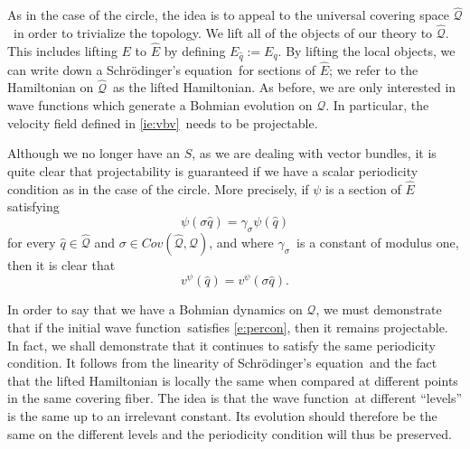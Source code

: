 \documentclass[11pt]{article}
\theoremstyle{remark}
\begin{document}
As in the case of the circle, the idea is to appeal to the universal covering
space \ensuremath{\widehat{\ensuremath{\mathcal{Q}}}}\ in order to trivialize the topology. We lift all of the
objects of our theory to \ensuremath{\widehat{\ensuremath{\mathcal{Q}}}}. This includes lifting $E$ to
$\ensuremath{\widehat{E}}$
by defining $E_{\ensuremath{\hat{q}}} \ensuremath{:=} E_{\ensuremath{q}}$. By lifting the local
objects, we can write down a Schr\"odinger's equation\ for sections of $\ensuremath{\widehat{E}}$; we refer
to the Hamiltonian on \ensuremath{\widehat{\ensuremath{\mathcal{Q}}}}\ as the lifted Hamiltonian.  
 As before, we are only interested in wave functions which
generate a Bohmian evolution on \ensuremath{\mathcal{Q}}. In particular, the velocity
field defined in \eqref{ie:vbv}\ needs to be projectable. 

Although we no longer have an $S$, as we are dealing with vector
bundles, it is quite clear that projectability is guaranteed 
if we have a scalar periodicity condition as in the case of the
circle. More precisely, if $\ensuremath{\psi}$ is a section of $\ensuremath{\widehat{E}}$ satisfying 
\begin{equation} \label{e:percon}
\ensuremath{\psi} (\ensuremath{\sigma} \ensuremath{\hat{q}})
= \ensuremath{\gamma_{\ensuremath{\sigma}}} \ensuremath{\psi}(\ensuremath{\hat{q}})
\end{equation}
for every $\ensuremath{\hat{q}} \in \ensuremath{\widehat{\ensuremath{\mathcal{Q}}}}$ and $\ensuremath{\sigma} \in \ensuremath{Cov(\ensuremath{\widehat{\ensuremath{\mathcal{Q}}}}, \ensuremath{\mathcal{Q}})}$, and 
where \ensuremath{\gamma_{\ensuremath{\sigma}}}\ is a constant of modulus 
one, then it is clear that 
\[v^{\ensuremath{\psi}} (\ensuremath{\hat{q}}) = v^{\ensuremath{\psi}} (\ensuremath{\sigma}\ensuremath{\hat{q}}). 
\]

In order to say that we have a Bohmian dynamics on \ensuremath{\mathcal{Q}}, we
must demonstrate that if the initial wave function\ satisfies \eqref{e:percon},
then it remains projectable. In fact, we shall demonstrate that it
continues to satisfy the same periodicity condition. It follows from 
the linearity of Schr\"odinger's equation\  and the fact that the lifted Hamiltonian is locally the
same when compared at different points in the same covering fiber. 
The idea is that the wave function\ at different ``levels'' is the same
up to an irrelevant constant. Its evolution 
 should therefore be the same on the different levels and the
periodicity condition will thus be preserved. 
\end{document}
